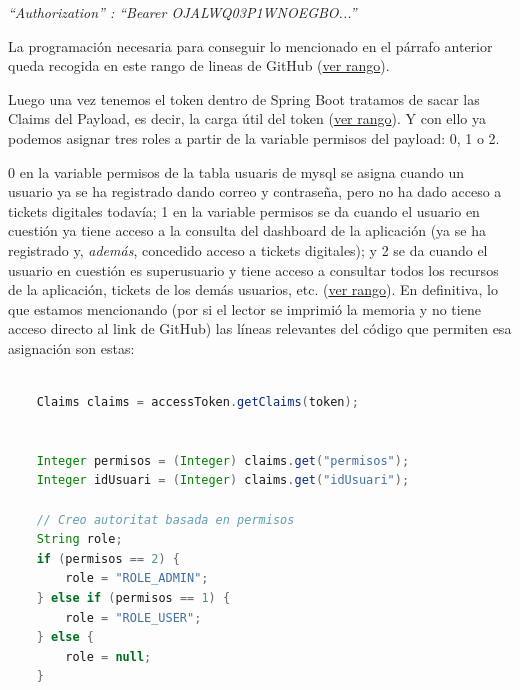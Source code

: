\documentclass[a4paper,12pt]{report}
\begin{document}
		
		\FloatBarrier
		\begin{table}[h]
				\centering
 				\textit{``Authorization'' : ``Bearer OJALWQ03P1WNOEGBO...''}
		\end{table}
		\FloatBarrier
		

		 
		  La programación necesaria para conseguir lo mencionado en el párrafo anterior queda recogida en este rango de lineas de GitHub (\href{https://github.com/blackcub3s/mercApp/blob/89efcf854d8bbab2addde3f7e817eb97f7737b95/APP%20WEB/__springboot__produccio__/app/src/main/java/miApp/app/seguretat/FiltreAutenticacioJwt.java#L33-L43}{ver rango}). 
		  
		  Luego una vez tenemos el token dentro de Spring Boot tratamos de sacar las Claims del Payload, es decir, la carga útil del token (\href{https://github.com/blackcub3s/mercApp/blob/89efcf854d8bbab2addde3f7e817eb97f7737b95/APP%20WEB/__springboot__produccio__/app/src/main/java/miApp/app/seguretat/FiltreAutenticacioJwt.java#L50-L54}{ver rango}). Y con ello ya podemos asignar tres roles a partir de la variable permisos del payload: 0, 1 o 2. 
		  
		  0 en la variable permisos de la tabla usuaris de mysql se asigna cuando un usuario ya se ha registrado dando correo y contraseña, pero no ha dado acceso a tickets digitales todavía; 1 en la variable permisos se da cuando el usuario en cuestión ya tiene acceso a la consulta del dashboard de la aplicación (ya se ha registrado y, \textit{además}, concedido acceso a tickets digitales); y 2 se da cuando el usuario en cuestión es superusuario y tiene acceso a consultar todos los recursos de la aplicación, tickets de los demás usuarios, etc. (\href{https://github.com/blackcub3s/mercApp/blob/89efcf854d8bbab2addde3f7e817eb97f7737b95/APP%20WEB/__springboot__produccio__/app/src/main/java/miApp/app/seguretat/FiltreAutenticacioJwt.java#L56-L66}{ver rango}). En definitiva, lo que estamos mencionando (por si el lector se imprimió la memoria y no tiene acceso directo al link de GitHub) las líneas relevantes del código que permiten esa asignación son estas:
		  
		  
		  
		  \begin{lstlisting}[language=Java, basicstyle=\ttfamily\footnotesize, keywordstyle=\color{magenta}]
		  
	Claims claims = accessToken.getClaims(token);
	
	
	Integer permisos = (Integer) claims.get("permisos"); 
	Integer idUsuari = (Integer) claims.get("idUsuari"); 
	
	// Creo autoritat basada en permisos
	String role;
	if (permisos == 2) {
	  	role = "ROLE_ADMIN";
	} else if (permisos == 1) {
	  	role = "ROLE_USER";
	} else {
	  	role = null;
	}
		  
		  \end{lstlisting}
		  
\end{document}
